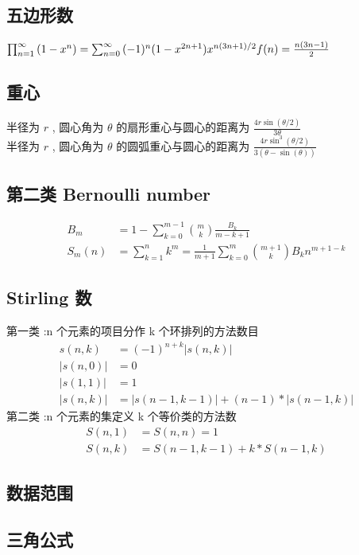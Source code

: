 \subsection{五边形数}
$
\prod_{n=1}^{\infty}{(1-x^{n})}=\sum_{n=0}^{\infty}{(-1)^{n}(1-x^{2n+1})x^{n(3n+1)/2}} \\
f(n) = \frac{n(3n - 1)}{2}
$
\subsection{重心}
半径为 $r$ , 圆心角为 $\theta$ 的扇形重心与圆心的距离为 $\frac{4r\sin(\theta/2)}{3\theta}$ \\
半径为 $r$ , 圆心角为 $\theta$ 的圆弧重心与圆心的距离为 $\frac{4r\sin^3(\theta/2)}{3(\theta-\sin(\theta))}$ \\
\subsection{第二类 Bernoulli number}
\begin{align*}
    B_m &= 1 - \sum_{k=0}^{m-1}{\binom{m}{k}\frac{B_{k}}{m-k+1}} \\
    S_m(n) &= \sum_{k=1}^{n}{k^{m}} = \frac{1}{m+1}\sum_{k=0}^{m}{\binom{m+1}{k}B_{k}n^{m+1-k}}
\end{align*}
\subsection{Stirling 数}
第一类 :n 个元素的项目分作 k 个环排列的方法数目\\
\begin{align*}
    s(n, k) &= (-1)^{n+k}|s(n, k)| \\
    |s(n, 0)| &=0\\ 
    |s(1, 1)| &=1 \\
    |s(n, k)| &=|s(n-1, k-1)|+(n-1)*|s(n-1, k)|
\end{align*}
第二类 :n 个元素的集定义 k 个等价类的方法数\\
\begin{align*}
    S(n,1)&=S(n,n)=1\\
    S(n,k)&=S(n-1,k-1)+k*S(n-1,k)
\end{align*}

\subsection{数据范围}


\subsection{三角公式}

